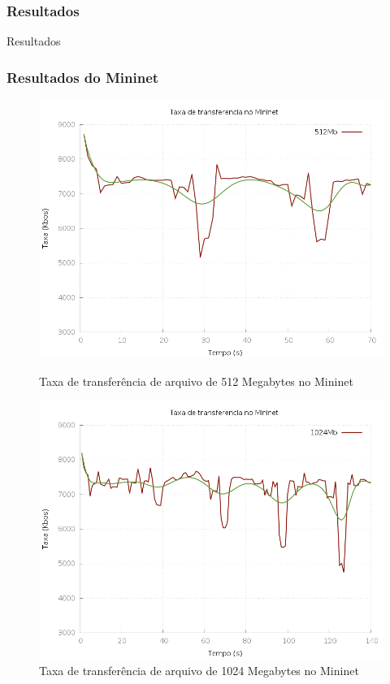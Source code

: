 \documentclass{beamer}
\begin{document}
\begin{frame}
    \frametitle{Resultados}

    \begin{center}
        {\huge Resultados}
    \end{center}
\end{frame}

\begin{frame}
    \frametitle{Resultados do Mininet}

    \begin{figure}[ht]
        \centering
        \begin{minipage}[b]{0.49\linewidth}
            \centering
            \includegraphics[width=\textwidth]{data/data_cp_mininet/taxa_512}
            \caption{Taxa de transferência de arquivo de 512 Megabytes no Mininet}
            \label{fig:mininet512}
        \end{minipage}
        \begin{minipage}[b]{0.49\linewidth}
            \centering
            \includegraphics[width=\textwidth]{data/data_cp_mininet/taxa_1024}
            \caption{Taxa de transferência de arquivo de 1024 Megabytes no Mininet}
            \label{fig:mininet1024}
        \end{minipage}
    \end{figure}
    \end{frame}
\end{document}
